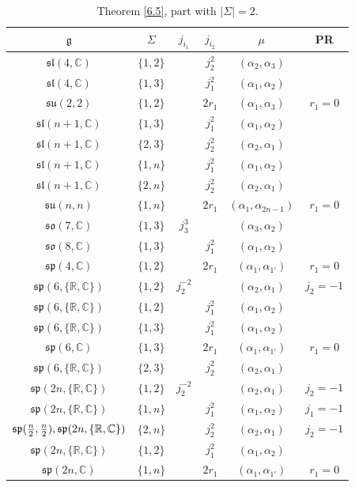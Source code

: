 \documentclass[10pt,a4paper]{amsart}
\newcommand{\Si}{\Sigma}
\newcommand{\fg}{\mathfrak g}
\newcommand{\R}{\mathbb{R}}
\newcommand{\C}{\mathbb{C}}
\numberwithin{equation}{section}
\begin{document}
\begin{table}[th!]\centering\caption{Theorem \ref{6.5}, part with $|\Si|=2$.}\label{ahs7}\vspace{1mm}

\begin{tabular}{|c|c|c|c|c|c|}
\hline
$\fg$ & $\Sigma$ & $j_{i_1}$& $j_{i_2}$& $\mu$&PR \\
\hline
\hline
$\mathfrak{sl}(4,\C)$ & $\{1,2\}$ &&$j_2^2$ & $(\alpha_2,\alpha_3)$ & \\
\hline
$\mathfrak{sl}(4,\C)$ & $\{1,3\}$ &&$j_1^2$ &$(\alpha_1,\alpha_2)$& \\
\hline
$\mathfrak{su}(2,2)$&$\{1,2\}$&& $2r_1$&$(\alpha_1,\alpha_{3})$&$r_1=0$\\
\hline
$\mathfrak{sl}(n+1,\C)$ & $\{1,3\}$ &&$j_1^2$ &$(\alpha_1,\alpha_2)$& \\
\hline
$\mathfrak{sl}(n+1,\C)$ & $\{2,3\}$ &&$j_2^2$ & $(\alpha_2,\alpha_1)$ & \\
\hline
$\mathfrak{sl}(n+1,\C)$ & $\{1,n\}$ &&$j_1^2$ &$(\alpha_1,\alpha_2)$& \\
\hline
$\mathfrak{sl}(n+1,\C)$ & $\{2,n\}$ &&$j_2^2$ & $(\alpha_2,\alpha_1)$ & \\
\hline
$\mathfrak{su}(n,n)$&$\{1,n\}$&& $2r_1$&$(\alpha_1,\alpha_{2n-1})$&$r_1=0$\\
\hline
$\mathfrak{so}(7,\C)$&$\{ 1,3\}$&$j_3^3$&& $(\alpha_3,\alpha_2)$& \\
\hline
$\mathfrak{so}(8,\C)$&$\{ 1,3\}$& & $j_1^2$& $(\alpha_1,\alpha_2)$& \\
\hline
$\mathfrak{sp}(4,\mathbb{C})$& $\{1,2\}$ && $2r_1$& $(\alpha_{1},\alpha_{1'})$ & $r_1=0$ \\
\hline
$\mathfrak{sp}(6,\{\R,\C\})$ & $\{1,2\}$ & $j_2^{-2}$ & & $(\alpha_2,\alpha_1)$ & $j_2=-1$ \\
\hline
$\mathfrak{sp}(6,\{\R,\C\})$ & $\{1,2\}$ & &$j_1^2$ & $(\alpha_1,\alpha_2)$&\\
\hline
$\mathfrak{sp}(6,\{\R,\C\})$ & $\{1,3\}$& & $j_1^2$& $(\alpha_1,\alpha_2)$ & \\
\hline
$\mathfrak{sp}(6,\mathbb{C})$& $\{1,3\}$ && $2r_1$& $(\alpha_{1},\alpha_{1'})$ & $r_1=0$ \\
\hline
$\mathfrak{sp}(6,\{\R,\C\})$& $\{2,3\}$ & & $j_2^2$& $(\alpha_2,\alpha_1)$ & \\
\hline
$\mathfrak{sp}(2n,\{\R,\C\})$ & $\{1,2\}$ & $j_2^{-2}$ & & $(\alpha_2,\alpha_1)$ & $j_2=-1$ \\
\hline
$\mathfrak{sp}(2n,\{\R,\C\})$ & $\{1,n\}$& & $j_1^2$& $(\alpha_1,\alpha_2)$ &$j_1=-1$ \\
\hline
$\mathfrak{sp}({n \over 2},{n \over 2}),\mathfrak{sp}(2n,\{\R,\C\})$& $\{2,n\}$ & & $j_2^2$& $(\alpha_2,\alpha_1)$ & $j_2=-1$ \\
\hline
$\mathfrak{sp}(2n,\{\R,\C\})$ & $\{1,2\}$ & &$j_1^2$ & $(\alpha_1,\alpha_2)$&\\
\hline
$\mathfrak{sp}(2n,\mathbb{C})$& $\{1,n\}$ && $2r_1$& $(\alpha_{1},\alpha_{1'})$ & $r_1=0$ \\
\hline
\end{tabular}
\end{table}
\end{document}
